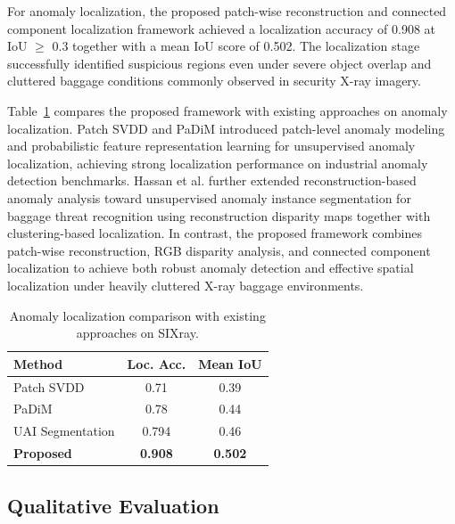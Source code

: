 \documentclass{bmvc2k}
\begin{document}
For anomaly localization, the proposed patch-wise reconstruction and connected component localization framework achieved a localization accuracy of 0.908 at IoU $\geq$ 0.3 together with a mean IoU score of 0.502. The localization stage successfully identified suspicious regions even under severe object overlap and cluttered baggage conditions commonly observed in security X-ray imagery.

Table~\ref{tab:localization_results} compares the proposed framework with existing approaches on anomaly localization. Patch SVDD \cite{yi2020patchsvdd} and PaDiM \cite{defard2020padim} introduced patch-level anomaly modeling and probabilistic feature representation learning for unsupervised anomaly localization, achieving strong localization performance on industrial anomaly detection benchmarks. Hassan et al. \cite{hassan2021unsupervised} further extended reconstruction-based anomaly analysis toward unsupervised anomaly instance segmentation for baggage threat recognition using reconstruction disparity maps together with clustering-based localization. In contrast, the proposed framework combines patch-wise reconstruction, RGB disparity analysis, and connected component localization to achieve both robust anomaly detection and effective spatial localization under heavily cluttered X-ray baggage environments.

\begin{table}[ht]
    \begin{center}
        \begin{tabular}{|l|c|c|}
            \hline
            Method & Loc. Acc. & Mean IoU \\
            \hline\hline
            Patch SVDD \cite{yi2020patchsvdd} & 0.71 & 0.39 \\
            PaDiM \cite{defard2020padim} & 0.78 & 0.44 \\
            UAI Segmentation \cite{hassan2021unsupervised} & 0.794 & 0.46 \\
            \textbf{Proposed} & \textbf{0.908} & \textbf{0.502} \\
            \hline
        \end{tabular}
    \end{center}
    \caption{Anomaly localization comparison with existing approaches on SIXray.}
    \label{tab:localization_results}
\end{table}

\subsection{Qualitative Evaluation}
\end{document}
